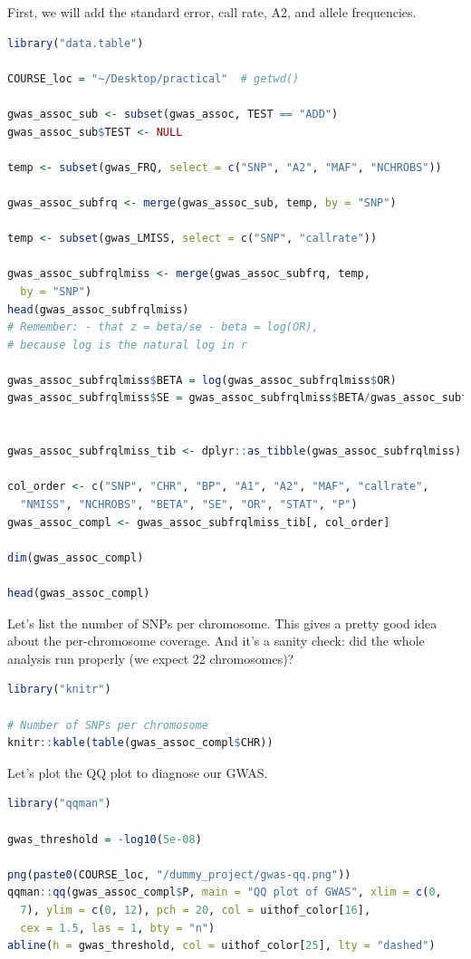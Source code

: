 \documentclass[
]{book}
\begin{document}
First, we will add the standard error, call rate, A2, and allele frequencies.

\begin{lstlisting}[language=R]
library("data.table")

COURSE_loc = "~/Desktop/practical"  # getwd()

gwas_assoc_sub <- subset(gwas_assoc, TEST == "ADD")
gwas_assoc_sub$TEST <- NULL

temp <- subset(gwas_FRQ, select = c("SNP", "A2", "MAF", "NCHROBS"))

gwas_assoc_subfrq <- merge(gwas_assoc_sub, temp, by = "SNP")

temp <- subset(gwas_LMISS, select = c("SNP", "callrate"))

gwas_assoc_subfrqlmiss <- merge(gwas_assoc_subfrq, temp,
  by = "SNP")
head(gwas_assoc_subfrqlmiss)
# Remember: - that z = beta/se - beta = log(OR),
# because log is the natural log in r

gwas_assoc_subfrqlmiss$BETA = log(gwas_assoc_subfrqlmiss$OR)
gwas_assoc_subfrqlmiss$SE = gwas_assoc_subfrqlmiss$BETA/gwas_assoc_subfrqlmiss$STAT


gwas_assoc_subfrqlmiss_tib <- dplyr::as_tibble(gwas_assoc_subfrqlmiss)

col_order <- c("SNP", "CHR", "BP", "A1", "A2", "MAF", "callrate",
  "NMISS", "NCHROBS", "BETA", "SE", "OR", "STAT", "P")
gwas_assoc_compl <- gwas_assoc_subfrqlmiss_tib[, col_order]

dim(gwas_assoc_compl)

head(gwas_assoc_compl)
\end{lstlisting}

Let's list the number of SNPs per chromosome. This gives a pretty good idea about the per-chromosome coverage. And it's a sanity check: did the whole analysis run properly (we expect 22 chromosomes)?

\begin{lstlisting}[language=R]
library("knitr")

# Number of SNPs per chromosome
knitr::kable(table(gwas_assoc_compl$CHR))
\end{lstlisting}

Let's plot the QQ plot to diagnose our GWAS.

\begin{lstlisting}[language=R]
library("qqman")

gwas_threshold = -log10(5e-08)

png(paste0(COURSE_loc, "/dummy_project/gwas-qq.png"))
qqman::qq(gwas_assoc_compl$P, main = "QQ plot of GWAS", xlim = c(0,
  7), ylim = c(0, 12), pch = 20, col = uithof_color[16],
  cex = 1.5, las = 1, bty = "n")
abline(h = gwas_threshold, col = uithof_color[25], lty = "dashed")
\end{lstlisting}
\end{document}
